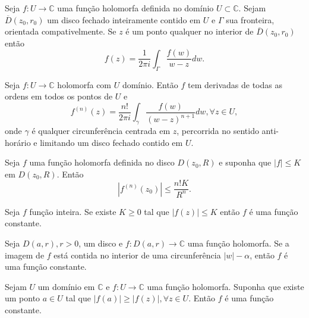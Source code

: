 \begin{teorema}
\label{teo:form-integral-cauchy}
Seja $f:U \to \mathbb{C}$ uma função holomorfa definida no domínio $U\subset\mathbb{C}$.
Sejam $\overline{D}(z_0, r_0)$ um disco fechado inteiramente contido em $U$ e $\Gamma$ sua fronteira, orientada compativelmente. 
Se $z$ é um ponto qualquer no interior de $\overline{D}(z_0, r_0)$ então
\begin{equation*}
    f(z) = \frac{1}{2\pi i}\int_{\Gamma} \frac{f(w)}{w-z}dw.
\end{equation*}
\end{teorema}


\begin{corolario}
Seja $f:U\to\mathbb{C}$ holomorfa com $U$ domínio. Então $f$ tem derivadas de todas as ordens em todos os pontos de $U$ e
\begin{equation*}
    f^{(n)}(z) = \frac{n!}{2\pi i}\int_{\gamma} \frac{f(w)}{(w-z)^{n+1}}dw, \forall z\in U,
\end{equation*}
onde $\gamma$ é qualquer circunferência centrada em $z$, percorrida no sentido anti-horário e limitando um disco fechado contido em $U$.
\end{corolario}


\begin{corolario}
Seja $f$ uma função holomorfa definida no disco $D(z_0, R)$ e suponha que
$|f|\leq K$ em $D(z_0, R)$. Então
\begin{equation*}
    |f^{(n)}(z_0)| \leq \frac{n!K}{R^n}.
\end{equation*}
\end{corolario}


\begin{corolario}
Seja $f$ função inteira. Se existe $K\geq 0$ tal que $|f(z)|\leq K$ então $f$ é uma função constante.
\end{corolario}


\begin{lema}
Seja $D(a,r), r>0$, um disco e $f: D(a,r)\to\mathbb{C}$ uma função holomorfa. 
Se a imagem de $f$ está contida no interior de uma circunferência $|w| - \alpha$, então $f$ é uma função constante.
\end{lema}


\begin{corolario}
Sejam $U$ um domínio em $\mathbb{C}$ e $f:U\to\mathbb{C}$ uma função holomorfa.
Suponha que existe um ponto $a\in U$ tal que $|f(a)| \geq |f(z)|, \forall z\in U$. Então $f$ é uma função constante.
\end{corolario}


